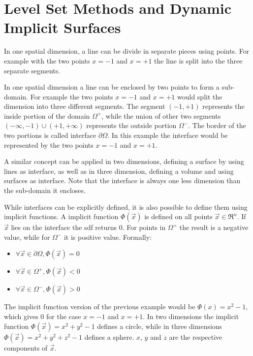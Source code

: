 \section{Level Set Methods and Dynamic Implicit Surfaces}
\cite{osher:2006:level}

In one spatial dimension, a line can be divide in separate pieces using points. For example with the two points  $x = -1$ and $x = +1$ the line is split into the three separate segments.

In one spatial dimension a line can be enclosed by two points to form a sub-domain. For example the two points $x = -1$ and $x = +1$ would split the dimension into three different segments. The segment $(-1, +1)$ represents the inside portion of the domain $\Omega^+$, while the union of other two segments  $(-\infty,-1) \cup (+1,+\infty) $ represents the outside portion $\Omega^-$. The border of the two portions is called interface  $\partial\Omega$. In this example the interface would be represented by the two points $x = -1$ and $x = +1$.

A similar concept can be applied in two dimensions, defining a surface by using lines as interface, as well as in three dimension, defining a volume and using surfaces as interface. Note that the interface is always one less dimension than the sub-domain it encloses.


While interfaces can be explicitly defined, it is also possible to define them using implicit functions.
A implicit function $\Phi(\vec{x})$ is defined on all points $\vec{x} \in \Re^n$. If $\vec{x}$ lies on the interface the \gls{sdf} returns 0. For points in $\Omega^+$ the result is a negative value, while for $\Omega^-$ it is positive value. Formally:
\begin{itemize}
	\item $\forall \vec{x} \in \partial\Omega,  \Phi(\vec{x}) = 0$ 
	\item $\forall \vec{x} \in \Omega^+,  \Phi(\vec{x}) < 0$
	\item $\forall \vec{x} \in \Omega^-,  \Phi(\vec{x}) > 0$
\end{itemize}

The implicit function version of the previous example would be $\Phi(x) = x^2 - 1$, which gives 0 for the case $x = -1$ and $x = +1$.
In two dimensions the implicit function $\Phi(\vec{x}) = x^2 + y^2 - 1$ defines a circle, while in three dimensions  $\Phi(\vec{x}) = x^2 + y^2 + z^2 - 1$ defines a sphere. $x$, $y$ and $z$ are the respective components of $\vec{x}$.

